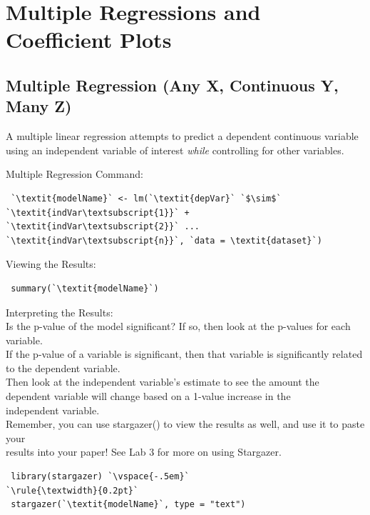 \documentclass[12pt,letterpaper]{article}
\newcommand{\ind}{\phantom{AA}}
\begin{document}
\newpage

\section{Multiple Regressions and Coefficient Plots}

\subsection{Multiple Regression (Any X, Continuous Y, Many Z)}
A multiple linear regression attempts to predict a dependent continuous variable using an independent variable of interest \textit{while} controlling for other variables.
\begin{tcolorbox}[title = Multiple Regression]
Multiple Regression Command:
\begin{lstlisting}
 `\textit{modelName}` <- lm(`\textit{depVar}` `$\sim$` `\textit{indVar\textsubscript{1}}` + `\textit{indVar\textsubscript{2}}` ... `\textit{indVar\textsubscript{n}}`, `data = \textit{dataset}`)
\end{lstlisting}
Viewing the Results:
\begin{lstlisting}
 summary(`\textit{modelName}`)
\end{lstlisting}
Interpreting the Results:\\
\ind Is the p-value of the model significant? If so, then look at the p-values for each \\ \ind \ind variable.\\
\ind If the p-value of a variable is significant, then that variable is significantly related\\ \ind \ind to the dependent variable. \\
\ind Then look at the independent variable's estimate to see the amount the \\ \ind \ind dependent variable will change based on a 1-value increase in the\\ \ind \ind independent variable.\\
Remember, you can use stargazer() to view the results as well, and use it to paste your\\ \ind  results into your paper! See Lab 3 for more on using Stargazer.
\begin{lstlisting}
 library(stargazer) `\vspace{-.5em}`
`\rule{\textwidth}{0.2pt}`
 stargazer(`\textit{modelName}`, type = "text")
\end{lstlisting}
\end{tcolorbox}
\end{document}

